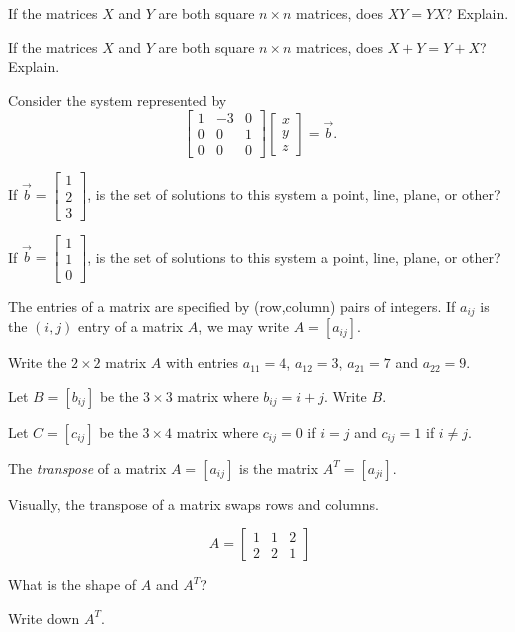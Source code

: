 \documentclass[14pt]{problemset}
\newcommand{\mat}[1]{\begin{bmatrix}#1\end{bmatrix}}
\begin{document}
	\question
	\begin{parts}
		\item If the matrices $X$ and $Y$ are both square $n\times n$ matrices,
		does $XY=YX$?  Explain.
		\item If the matrices $X$ and $Y$ are both square $n\times n$ matrices,
		does $X+Y=Y+X$?  Explain.
	\end{parts}

	\question
	Consider the system represented by
	\[
		\mat{1&-3&0\\0&0&1\\0&0&0}\mat{x\\y\\z}=\vec b.
	\]
	\begin{parts}
		\item If $\vec b=\mat{1\\2\\3}$, is the set of solutions to this system a 
		point, line, plane, or other?
		\item If $\vec b=\mat{1\\1\\0}$, is the set of solutions to this system a 
		point, line, plane, or other?
	\end{parts}

	\question
	The entries of a matrix are specified by (row,column) pairs of integers.  If
	$a_{ij}$ is the $(i,j)$ entry of a matrix $A$, we may write $A=[a_{ij}]$.
	\begin{parts}
		\item Write the $2\times 2$ matrix $A$ with entries $a_{11} = 4$, $a_{12}=3$,
			$a_{21} = 7$ and $a_{22}=9$.
		\item Let $B=[b_{ij}]$ be the $3\times 3$ matrix where $b_{ij} = i+j$.  Write $B$.
		\item Let $C=[c_{ij}]$ be the $3\times 4$ matrix where $c_{ij} = 0$ if $i=j$ and
			$c_{ij}=1$ if $i\neq j$.
	\end{parts}

	\question
	\begin{definition}
		The \emph{transpose} of a matrix $A=[a_{ij}]$ is the matrix $A^{T}=[a_{ji}]$.
	\end{definition}
	Visually, the transpose of a matrix swaps rows and columns.

	\[
		A=\mat{1&1&2\\2&2&1}
	\]
	\begin{parts}
		\item What is the shape of $A$ and $A^T$?
		\item Write down $A^T$.
	\end{parts}
\end{document}
